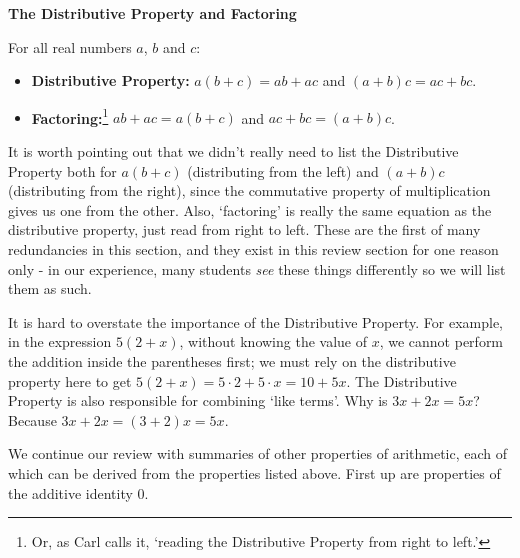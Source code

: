 \documentclass{ximera}
\begin{document}
\medskip

\label{distributiveproperty}


\centerline{\textbf{The Distributive Property and Factoring}}
For all real numbers $a$, $b$ and $c$:

\begin{itemize}

\item  \textbf{Distributive Property:}   $a(b+c) = ab + ac$ and $(a+b)c = ac + bc$.

\item  \textbf{Factoring:}\footnote{Or, as Carl calls it, `reading the Distributive Property from right to left.'}   $ab+ac = a(b+c)$ and $ac + bc = (a+b)c$.

\end{itemize}


\medskip

It is worth pointing out that we didn't really need to list the Distributive Property both for $a(b+c)$ (distributing from the left) and $(a+b)c$ (distributing from the right), since the commutative property of multiplication gives us one from the other.  Also, `factoring' is really the same equation as the distributive property, just read from right to left. These are the first of many redundancies in this section, and they exist in this review section for one reason only - in our experience, many students \textit{see} these things differently so we will list them as such.   

\medskip

It is hard to overstate the importance of the Distributive Property.  For example, in the expression $5(2+x)$, without knowing the value of $x$, we cannot perform the addition inside the parentheses first;  we must rely on the distributive property here to get  $5(2+x) = 5\cdot 2 + 5 \cdot x = 10 + 5x$.  The Distributive Property is also responsible for combining `like terms'.  Why is $3x + 2x = 5x$?  Because  $3x + 2x = (3+2)x = 5x$.  

\medskip

We continue our review with summaries of other properties of arithmetic, each of which can be derived from the properties listed above.  First up are properties of the additive identity $0$.

\medskip

\label{propertiesofzero}
\end{document}
